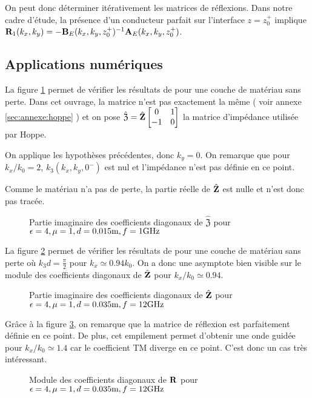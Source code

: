     On peut donc déterminer itérativement les matrices de réflexions. Dans notre cadre d'étude, la présence d'un conducteur parfait sur l'interface \(z=z_0^+\) implique \(\mathbf{R}_{1}(k_x,k_y) = -\mathbf{B}_E(k_x,k_y,z_0^+)^{-1}\mathbf{A}_E(k_x,k_y,z_0^+)\).

\subsection{Applications numériques}

  La figure \ref{fig:imp_fourier:plan:hoppe} permet de vérifier les résultats de \cite[p.~33]{hoppe_impedance_1995} pour une couche de matériau sans perte. Dans cet ouvrage, la matrice n’est pas exactement la même ( voir annexe \ref{sec:annexe:hoppe} ) et on pose \(\hat{\mathfrak{Z}} = \hat{\mathbf{Z}}\begin{bmatrix}0&1\\-1&0\end{bmatrix}\) la matrice d'impédance utilisée par Hoppe.

  On applique les hypothèses précédentes, donc \(k_y=0\). On remarque que pour \(k_x\slash k_0=2\), \(k_3(k_x,k_y,0^-)\) est nul et l'impédance n'est pas définie en ce point. 

  Comme le matériau n'a pas de perte, la partie réelle de \(\hat{\mathfrak{\mathbf{Z}}}\) est nulle et n'est donc pas tracée.
  \begin{figure}[!hbt]
      \centering
      
      \caption[Reproduction résultat Hoppe & Rahmat-Samii p.~33]{Partie imaginaire des coefficients diagonaux de \(\hat{\mathfrak Z}\) pour \(\epsilon = 4, \mu = 1, d=0.015\text{m}, f=1\text{GHz}\)}
      \label{fig:imp_fourier:plan:hoppe}
  \end{figure}

  La figure \ref{fig:imp_fourier:plan:soudais} permet de vérifier les résultats de \cite{soudais_3d_2017} pour une couche de matériau sans perte où \(k_3d = \frac{\pi}{2}\) pour \(k_x \simeq 0.94 k_0\). On a donc une asymptote bien visible sur le module des coefficients diagonaux de \(\hat{\mathbf{Z}}\) pour \(k_x\slash k_0 \simeq 0.94\).
  \begin{figure}[!hbt]
      \centering
      
      \caption[Reproduction résultat P. Soudais p.~11]{Partie imaginaire des coefficients diagonaux de \(\hat{\mathbf{Z}}\) pour \(\epsilon = 4, \mu = 1, d=0.035\text{m}, f=12\text{GHz}\)}
      \label{fig:imp_fourier:plan:soudais}
  \end{figure}

  Grâce à la figure \ref{fig:reflex_fourier:plan:soudais}, on remarque que la matrice de réflexion est parfaitement définie en ce point. De plus, cet empilement permet d'obtenir une onde guidée pour \(k_x\slash k_0 \simeq 1.4\) car le coefficient TM diverge en ce point. C'est donc un cas très intéressant.
  \begin{figure}[!hbt]
      \centering
      
      \caption[Reproduction résultat P. Soudais p.~11]{Module des coefficients diagonaux de \(\mathbf{R}\) pour \(\epsilon = 4, \mu = 1, d=0.035\text{m}, f=12\text{GHz}\)}
      \label{fig:reflex_fourier:plan:soudais}
  \end{figure}


\FloatBarrier